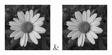 \begin{table}[h!]
\begin{tabular}
        \includegraphics[width=2cm]{images/processed/flower/gaussian_5x5_sigma1.0/unblurred_5-iter.png} &
        \includegraphics[width=2cm]{images/processed/flower/gaussian_5x5_sigma2.0/unblurred_5-iter.png}                                                                                                                                                                                                 \\
    \end{tabular}
\end{table}

